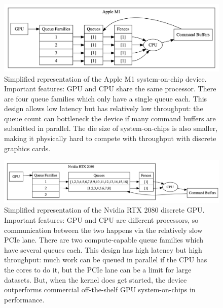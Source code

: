 \documentclass{report}
\begin{document}
\begin{figure}
  \centering
  \includegraphics[scale=0.25]{./assets/m1.png}
  \caption{Simplified representation of the Apple M1 system-on-chip device. Important features: GPU and CPU share the same processor. There are four queue families which only have a single queue each. This design allows low latency but has relatively low throughput: the queue count can bottleneck the device if many command buffers are submitted in parallel. The die size of system-on-chips is also smaller, making it physically hard to compete with throughput with discrete graphics cards.}
  \label{fig:m1}
\end{figure}

\begin{figure}
  \centering
  \includegraphics[scale=0.25]{./assets/rtx.png}
  \caption{Simplified representation of the Nvidia RTX 2080 discrete GPU. Important features: GPU and CPU are different processors, so communication between the two happens via the relatively slow PCIe lane. There are two compute-capable queue families which have several queues each. This design has high latency but high throughput: much work can be queued in parallel if the CPU has the cores to do it, but the PCIe lane can be a limit for large datasets. But, when the kernel does get started, the device outperforms commercial off-the-shelf GPU system-on-chips in performance.}
  \label{fig:rtx}
\end{figure}
\end{document}
